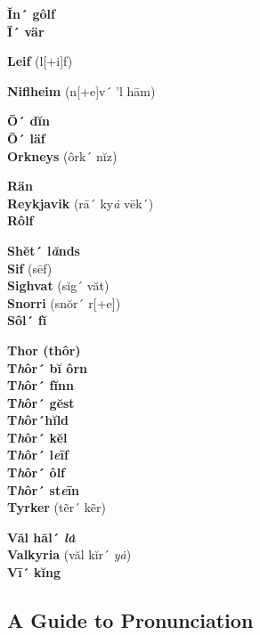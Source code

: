\begin{multicols}{3}
\noindent\textbf{Ĭn´ gôlf}\\
\textbf{Ī´ vär}

\noindent\textbf{Leif} (l{[}+i{]}f)

\noindent\textbf{Niflheim} (n{[}+e{]}v´ 'l hām)

\noindent\textbf{Ō´ dĭn}\\
\textbf{Ō´ läf}\\
\textbf{Orkneys} (ôrk´ nĭz)

\noindent\textbf{Rän}\\
\textbf{Reykjavik} (rā´ ky\emph{ȧ} vēk´)\\
\textbf{Rôlf}

\noindent\textbf{Shĕt´ l\emph{ă}nds}\\
\textbf{Sif} (sēf)\\
\textbf{Sighvat} (sĭg´ văt)\\
\textbf{Snorri} (snŏr´ r{[}+e{]})\\
\textbf{Sôl´ fĭ}

\noindent\textbf{Thor (thôr)}\\
\textbf{T\emph{h}ôr´ bĭ ôrn}\\
\textbf{T\emph{h}ôr´ fĭnn}\\
\textbf{T\emph{h}ôr´ gĕst}\\
\textbf{T\emph{h}ôr´hĭld}\\
\textbf{T\emph{h}ôr´ kĕl}\\
\textbf{T\emph{h}ôr´ l\emph{e}īf}\\
\textbf{T\emph{h}ôr´ ôlf}\\
\textbf{T\emph{h}ôr´ st\emph{e}īn}\\
\textbf{Tyrker} (tẽr´ kẽr)

\noindent\textbf{Văl hăl´ \emph{lȧ}}\\
\textbf{Valkyria} (văl kĭr´ \emph{yȧ})\\
\textbf{Vī´ kĭng}
\end{multicols}

\subsection*{A Guide to Pronunciation}

